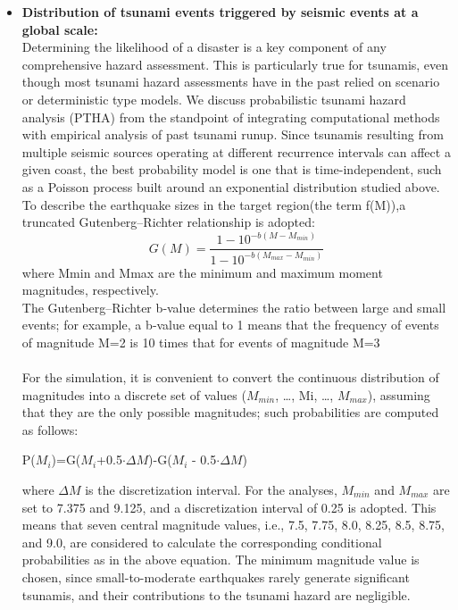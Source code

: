 \documentclass{article}
\begin{document}
\begin{itemize}
\item \textbf{Distribution of tsunami events triggered by seismic events at a global scale:}\\
     Determining the likelihood of a disaster is a key component of any comprehensive hazard assessment. This is particularly true for tsunamis, even though most tsunami hazard assessments have in the past relied on scenario or deterministic type models. We discuss probabilistic tsunami hazard analysis (PTHA) from the standpoint of integrating computational methods with empirical analysis of past tsunami runup.
     Since tsunamis resulting from multiple seismic sources operating at different recurrence intervals can affect a given coast, the best probability model is one that is time-independent, such as a Poisson process built around an exponential distribution studied above.\\
      To describe the earthquake sizes in the target region(the term f(M)),a truncated Gutenberg–Richter relationship\cite{cite8} is adopted: \\
    $$G(M)=\frac{1-10^{-b(M-M_{min})}}{1-10^{-b(M_{max}-M_{min})}}$$ \cite{cite2}
    where Mmin and Mmax are the minimum and maximum moment magnitudes, respectively.\\
    The Gutenberg–Richter b‐value determines the ratio between large and small events; for example, a b‐value equal to 1 means that the frequency of events of magnitude M=2 is 10 times that for events of magnitude M=3\\
    \\
    For the simulation, it is convenient to convert the continuous distribution of magnitudes into a discrete set of values ($M_{min}$, …, Mi, …, $M_{max}$), assuming that they are the only possible magnitudes; such probabilities are computed as follows:\\
    \begin{center}
        P($M_{i}$)=G($M_{i}$+0.5$ \cdot \Delta M$)-G($M_{i}$ - 0.5$ \cdot \Delta M$)
    \end{center}
    
where $\Delta M$ is the discretization interval. 
For the analyses, $M_{min}$ and $M_{max}$ are set to 7.375 and 9.125, and a discretization interval of 0.25 is adopted. This means that seven central magnitude values, i.e., 7.5, 7.75, 8.0, 8.25, 8.5, 8.75, and 9.0, are considered to calculate the corresponding conditional probabilities as in the above equation. The minimum magnitude value is chosen, since small-to-moderate earthquakes rarely generate significant tsunamis, and their contributions to the tsunami hazard are negligible.\cite{cite5}\\  


\end{itemize}
\end{document}
